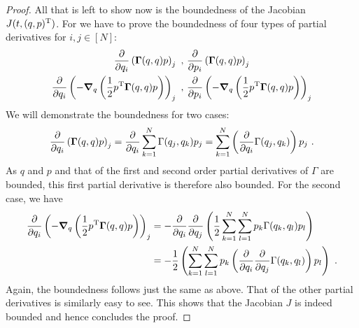 \begin{proof}
	All that is left to show now is the boundedness of the Jacobian $J(t, (q, p)^{\mathrm{T}})$.
	For we have to prove the boundedness of four types of partial derivatives for $i, j \in [N]$:
	\begin{align}
		\frac{\partial}{\partial q_{i}} \left(\bGamma(q, q) p\right)_j \ ,\
		&\frac{\partial}{\partial p_{i}} \left(\bGamma(q, q) p\right)_j \\
		\frac{\partial}{\partial q_{i}} \left(-\grad_q \left(\frac{1}{2} p^\mathrm{T} \bGamma(q, q) p\right)\right)_j \ ,\
		&\frac{\partial}{\partial p_{i}} \left(-\grad_q \left(\frac{1}{2} p^\mathrm{T} \bGamma(q, q) p\right)\right)_j\\
	\end{align}
	We will demonstrate the boundedness for two cases:
	\begin{equation}
		\frac{\partial}{\partial q_{i}} \left(\mathbf{\Gamma}(q, q) p\right)_j
		= \frac{\partial}{\partial q_{i}} \sum_{k=1}^N \Gamma(q_j, q_k) p_j
		=  \sum_{k=1}^N \left(\frac{\partial}{\partial q_{i}} \Gamma(q_j, q_k)\right) p_j \ .
	\end{equation}
	As $q$ and $p$ and that of the first and second order partial derivatives of $\Gamma$ are bounded, this first partial derivative is therefore also bounded.
	For the second case, we have
	\begin{align}
		\frac{\partial}{\partial q_{i}} \left(-\grad_q \left(\frac{1}{2} p^\mathrm{T} \bGamma(q, q) p\right)\right)_j
		&= - \frac{\partial}{\partial q_i} \frac{\partial}{\partial q_j} \left(\frac{1}{2}
		\sum_{k=1}^N\sum_{l=1}^{N} p_k \Gamma(q_k, q_l) p_l\right)\\
		&= -\frac{1}{2} \left(
		\sum_{k=1}^N\sum_{l=1}^{N} p_k \left(\frac{\partial}{\partial q_i} \frac{\partial}{\partial q_j} \Gamma(q_k, q_l)\right) p_l\right) \ .
	\end{align}
	Again, the boundedness follows just the same as above.
	That of the other partial derivatives is similarly easy to see.
	This shows that the Jacobian $J$ is indeed bounded and hence concludes the proof.
	

\end{proof}
